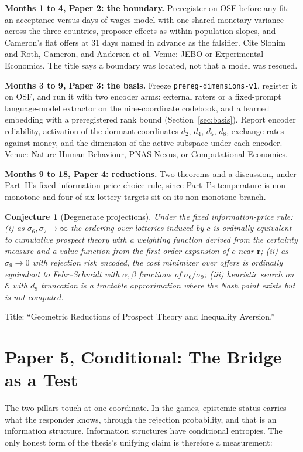 \documentclass[11pt,onecolumn]{IEEEtran}
\newtheorem{conjecture}[theorem]{Conjecture}
\begin{document}
\textbf{Months 1 to 4, Paper 2: the boundary.}
Preregister on OSF before any fit: an acceptance-versus-days-of-wages model with one shared monetary variance across the three countries, proposer effects as within-population slopes, and Cameron's flat offers at 31 days named in advance as the falsifier.
Cite Slonim and Roth, Cameron, and Andersen et al.
Venue: JEBO or Experimental Economics.
The title says a boundary was located, not that a model was rescued.

\textbf{Months 3 to 9, Paper 3: the basis.}
Freeze \texttt{prereg-dimensions-v1}, register it on OSF, and run it with two encoder arms: external raters or a fixed-prompt language-model extractor on the nine-coordinate codebook, and a learned embedding with a preregistered rank bound (Section~\ref{sec:basis}).
Report encoder reliability, activation of the dormant coordinates $d_2$, $d_4$, $d_5$, $d_8$, exchange rates against money, and the dimension of the active subspace under each encoder.
Venue: Nature Human Behaviour, PNAS Nexus, or Computational Economics.

\textbf{Months 9 to 18, Paper 4: reductions.}
Two theorems and a discussion, under Part~II's fixed information-price choice rule, since Part~I's temperature is non-monotone and four of six lottery targets sit on its non-monotone branch.
\begin{conjecture}[Degenerate projections]
Under the fixed information-price rule:
(i) as $\sigma_6,\sigma_7\to\infty$ the ordering over lotteries induced by $c$ is ordinally equivalent to cumulative prospect theory with a weighting function derived from the certainty measure and a value function from the first-order expansion of $c$ near $\mathbf r$;
(ii) as $\sigma_9\to0$ with rejection risk encoded, the cost minimizer over offers is ordinally equivalent to Fehr--Schmidt with $\alpha,\beta$ functions of $\sigma_6/\sigma_9$;
(iii) heuristic search on $\mathcal E$ with $d_9$ truncation is a tractable approximation where the Nash point exists but is not computed.
\end{conjecture}
Title: ``Geometric Reductions of Prospect Theory and Inequality Aversion.''

\section{Paper 5, Conditional: The Bridge as a Test}
\label{sec:conjecture}

The two pillars touch at one coordinate.
In the games, epistemic status carries what the responder knows, through the rejection probability, and that is an information structure.
Information structures have conditional entropies.
The only honest form of the thesis's unifying claim is therefore a measurement:
\end{document}
